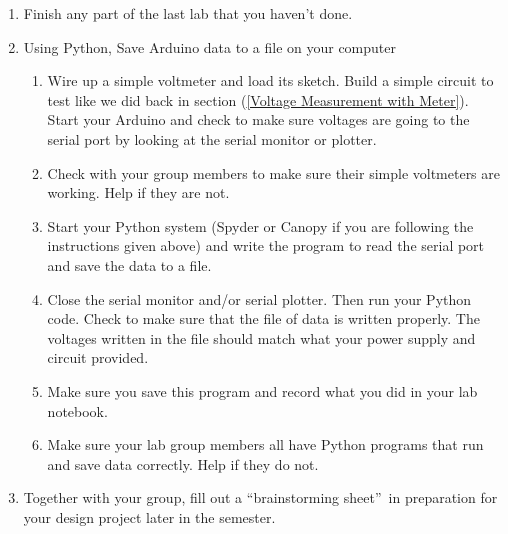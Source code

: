 \begin{enumerate}
\item Finish any part of the last lab that you haven't done.

\item Using Python, Save Arduino data to a file on your computer

	\begin{enumerate}
	\item Wire up a simple voltmeter and load its sketch. Build a simple circuit
	to test like we did back in section (\ref{Voltage Measurement with Meter}).
	Start your Arduino and check to make sure voltages are going to the serial
	port by looking at the serial monitor or plotter.
	
	\item Check with your group members to make sure their simple voltmeters are
	working. Help if they are not.
	
	\item Start your Python system (Spyder or Canopy if you are following the
	instructions given above) and write the program to read the serial port and
	save the data to a file.
	
	\item Close the serial monitor and/or serial plotter. Then run your Python
	code. Check to make sure that the file of data is written properly. The
	voltages written in the file should match what your power supply and circuit
	provided.
	
	\item Make sure you save this program and record what you did in your lab
	notebook.
	
	\item Make sure your lab group members all have Python programs that run and
	save data correctly. Help if they do not.
	\end{enumerate}

\item Together with your group, fill out a \textquotedblleft brainstorming
sheet\textquotedblright\ in preparation for your design project later in the
semester.


\end{enumerate}
